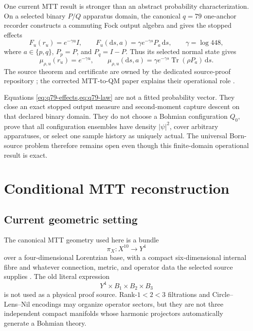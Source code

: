 \documentclass[11pt]{article}
\theoremstyle{definition}
\theoremstyle{remark}
\newcommand{\dd}{\mathrm d}
\newcommand{\Tr}{\operatorname{Tr}}
\begin{document}
One current MTT result is stronger than an abstract probability
characterization.  On a selected binary \(P/Q\) apparatus domain, the
canonical \(q=79\) one-anchor recorder constructs a commuting Fock output
algebra and gives the stopped effects
\begin{equation}
F_u(r_u)=e^{-\gamma u}I,
\qquad
F_u(\dd s,a)
=\gamma e^{-\gamma s}P_a\,\dd s,
\qquad
\gamma=\log448,
\label{eq:q79-effects}
\end{equation}
where \(a\in\{p,q\}\), \(P_p=P\), and \(P_q=I-P\).  Thus its selected normal
state gives
\begin{equation}
\mu_{\rho,u}(r_u)=e^{-\gamma u},
\qquad
\mu_{\rho,u}(\dd s,a)
=\gamma e^{-\gamma s}\Tr(\rho P_a)\,\dd s.
\label{eq:q79-law}
\end{equation}
The source theorem and certificate are owned by the dedicated source-proof
repository \cite{Q79Recorder2026}; the corrected MTT-to-QM paper explains
their operational role \cite{MTTQM2026}.

Equations \cref{eq:q79-effects,eq:q79-law} are not a fitted probability
vector.  They close an exact stopped output measure and second-moment
capture descent on that declared binary domain.  They do not choose a
Bohmian configuration \(Q_0\), prove that all configuration ensembles have
density \(|\psi|^2\), cover arbitrary apparatuses, or select one sample
history as uniquely actual.  The universal Born-source problem therefore
remains open even though this finite-domain operational result is exact.

\section{Conditional MTT reconstruction}
\label{sec:mtt}

\subsection{Current geometric setting}

The canonical MTT geometry used here is a bundle
\[
\pi_X:X^{10}\longrightarrow Y^4
\]
over a four-dimensional Lorentzian base, with a compact
six-dimensional internal fibre and whatever connection, metric, and
operator data the selected source supplies \cite{MTTFoundation2026}.  The
old literal expression
\[
Y^4\times B_1\times B_2\times B_3
\]
is not used as a physical proof source.  Rank-\(1<2<3\) filtrations and
Circle--Lens--Nil encodings may organize operator sectors, but they are not
three independent compact manifolds whose harmonic projectors
automatically generate a Bohmian theory.
\end{document}
